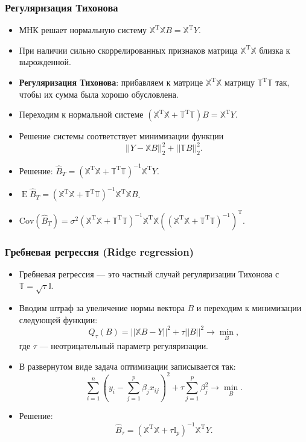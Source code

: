 \documentclass[10pt,unicode, notheorems]{beamer}
\DeclareMathOperator{\E}{E}
\DeclareMathOperator{\T}{T}
\begin{document}
\begin{frame}
\frametitle{Регуляризация Тихонова}

\begin{itemize}
\item МНК решает нормальную систему $\mathbb{X}^{\T}\mathbb{X}B=\mathbb{X}^{\T}Y$.
\item При наличии сильно скоррелированных признаков матрица $\mathbb{X}^{\T}\mathbb{X}$  близка к вырожденной.
\item \textbf{Регуляризация Тихонова}: прибавляем к матрице $\mathbb{X}^{\T}\mathbb{X}$ матрицу $\mathbb{T}^{\T}\mathbb{T}$ так, чтобы их сумма была хорошо обусловлена.
\item Переходим к нормальной системе $(\mathbb{X}^{\T}\mathbb{X}+\mathbb{T}^{\T}\mathbb{T})B=\mathbb{X}^{\T}Y$.
\item Решение системы соответствует минимизации функции 
\begin{equation*}
||Y-\mathbb{X}B||_{2}^{2}+||\mathbb{T}B||_{2}^{2}.
\end{equation*}
\item Решение:  
$
\hat{B}_{T}
=(\mathbb{X}^{\T}\mathbb{X}+\mathbb{T}^{\T}\mathbb{T})^{-1}\mathbb{X}^{\T} Y
$.
\item 
$
\E\hat{B}_{T}
=
(\mathbb{X}^{\T}\mathbb{X}+\mathbb{T}^{\T}\mathbb{T})^{-1}\mathbb{X}^{\T}\mathbb{X}B
$.
\item
$
\mathrm{Cov}(\hat{B}_{T})
=
\sigma^{2}
(\mathbb{X}^{\T}\mathbb{X}+\mathbb{T}^{\T}\mathbb{T})^{-1}
\mathbb{X}^{\T}\mathbb{X}
((\mathbb{X}^{\T}\mathbb{X}+\mathbb{T}^{\T}\mathbb{T})^{-1})^{\T}
$.
\end{itemize}
\end{frame}

\begin{frame}
\frametitle{Гребневая регрессия (Ridge regression)}


\begin{itemize}
\item Гребневая регрессия --- это частный случай регуляризации Тихонова с $\mathbb{T}=\sqrt{\tau}\mathbb{I}$.
\item Вводим штраф за увеличение нормы вектора $B$ и переходим к минимизации следующей функции:
\begin{equation*}
Q_{\tau}(B)
=
||\mathbb{X}B-Y||^{2}
+
\tau||B||^{2}
\rightarrow\min_{B},
\end{equation*}
где $\tau$ --- неотрицательный параметр регуляризации.
\item В развернутом виде задача оптимизации записывается так:
\begin{equation*}
\sum_{i=1}^{n}
\left(
y_{i}
-
\sum_{j=1}^{p}\beta_{j}x_{ij}
\right)^{2}
+
\tau\sum_{j=1}^{p}\beta_{j}^{2}
\rightarrow\min_{B}.
\end{equation*}
\item Решение:
\begin{equation*}
\hat{B}_{\tau}
=
(\mathbb{X}^{\mathrm{T}}\mathbb{X}+\tau\mathbb{I}_{p})^{-1}\mathbb{X}^{\mathrm{T}}Y.
\end{equation*}
\end{itemize}

\end{frame}
\end{document}

